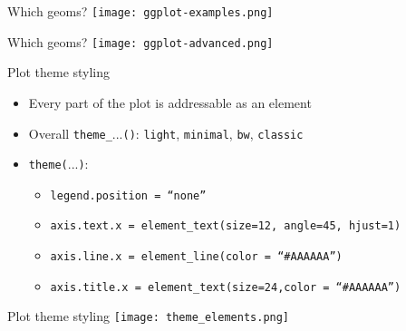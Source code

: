 \documentclass[10pt]{beamer}
\begin{document}
\begin{frame}{Which geoms?}
  \texttt{[image: ggplot-examples.png]}
  \end{frame}

\begin{frame}{Which geoms?}
  \texttt{[image: ggplot-advanced.png]}
  \end{frame}

\begin{frame}{Plot theme styling}
    \begin{itemize}
    \item Every part of the plot is addressable as an element
    \item Overall \texttt{theme\_}...\texttt{()}: \texttt{light}, \texttt{minimal}, \texttt{bw}, \texttt{classic}
    \item \texttt{theme(}...\texttt{)}:
      \begin{itemize}
      \item \texttt{legend.position = ``none''}
      \item \texttt{axis.text.x = element\_text(size=12, angle=45, hjust=1)}
      \item \texttt{axis.line.x = element\_line(color = ``\#AAAAAA'')}
        \item \texttt{axis.title.x = element\_text(size=24,color = ``\#AAAAAA'')}
      \end{itemize}
      \end{itemize}
\end{frame}

\begin{frame}{Plot theme styling}
  \texttt{[image: theme\_elements.png]} \\
  \end{frame}
\end{document}
